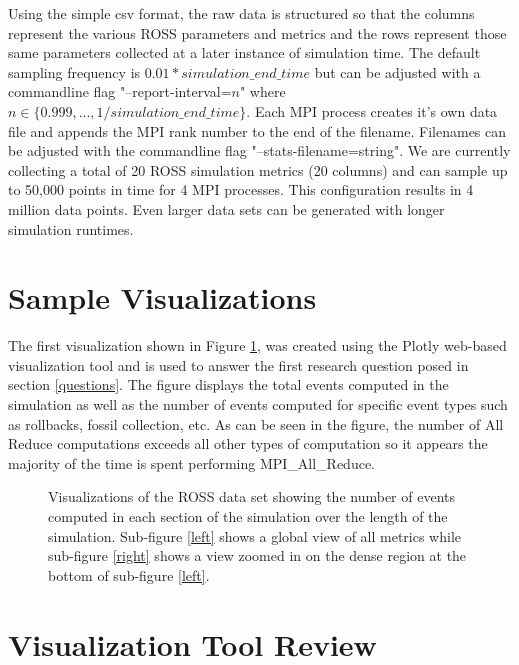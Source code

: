 \documentclass[12pt]{article}
\begin{document}
Using the simple csv format, the raw data is structured so that the columns represent the various ROSS parameters and metrics and the rows represent those same parameters collected at a later instance of simulation time. The default sampling frequency is $0.01*simulation\_end\_time$ but can be adjusted with a commandline flag "--report-interval=$n$" where $n\in \{0.999, ..., 1/simulation\_end\_time\}$. Each MPI process creates it's own data file and appends the MPI rank number to the end of the filename. Filenames can be adjusted with the commandline flag "--stats-filename=string". We are currently collecting a total of 20 ROSS simulation metrics (20 columns) and can sample up to 50,000 points in time for 4 MPI processes. This configuration results in 4 million data points. Even larger data sets can be generated with longer simulation runtimes.

\section{Sample Visualizations}

The first visualization shown in Figure \ref{Area}, was created using the Plotly web-based visualization tool and is used to answer the first research question posed in section \ref{questions}. The figure displays the total events computed in the simulation as well as the number of events computed for specific event types such as rollbacks, fossil collection, etc. As can be seen in the figure, the number of All Reduce computations exceeds all other types of computation so it appears the majority of the time is spent performing MPI\_All\_Reduce. 

\begin{figure}[!ht]
     \centering
     \caption{Visualizations of the ROSS data set showing the number of events computed in each section of the simulation over the length of the simulation. Sub-figure \ref{left} shows a global view of all metrics while sub-figure \ref{right} shows a view zoomed in on the dense region at the bottom of sub-figure \ref{left}.}
     \label{Area}
\end{figure}

\section{Visualization Tool Review}



\end{document}
